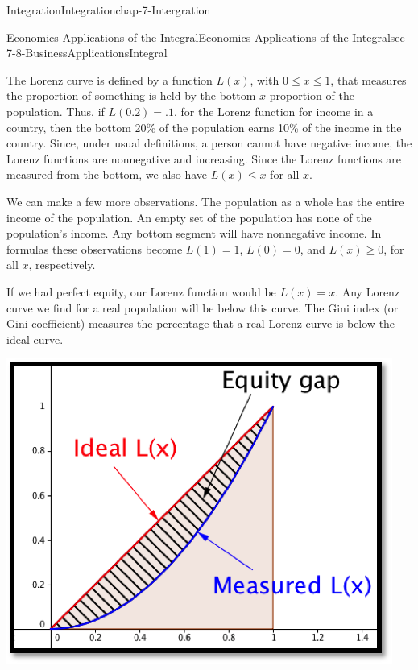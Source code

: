 \documentclass[oneside,10pt,]{book}
\numberwithin{equation}{section}
\begin{document}
\begin{chapterptx}{Integration}{}{Integration}{}{}{chap-7-Intergration}
\begin{sectionptx}{Economics Applications of the Integral}{}{Economics Applications of the Integral}{}{}{sec-7-8-BusinessApplicationsIntegral}
\par
\hypertarget{p-3111}{}%
The Lorenz curve is defined by a function \(L(x)\), with \(0\le x\le 1\), that measures the proportion of something is held by the bottom \(x\) proportion of the population.  Thus, if \(L(0.2)=.1\), for the Lorenz function for income in a country, then the bottom 20\% of the population earns 10\% of the income in the country.  Since, under usual definitions, a person cannot have negative income, the Lorenz functions are nonnegative and increasing.  Since the Lorenz functions are measured from the bottom, we also have \(L(x)\le x\) for all \(x\).%
\par
\hypertarget{p-3112}{}%
We can make a few more observations.  The population as a whole has the entire income of the population.  An empty set of the population has none of the population's income.  Any bottom segment will have nonnegative income.  In formulas these observations become \(L(1)=1\), \(L(0)=0\), and \(L(x)\ge 0\), for all \(x\), respectively.%
\par
\hypertarget{p-3113}{}%
If we had perfect equity, our Lorenz function would be \(L(x)=x\).  Any Lorenz curve we find for a real population will be below this curve.  The Gini index (or Gini coefficient) measures the percentage that a real Lorenz curve is below the ideal curve.%
\begin{sidebyside}{1}{0.25}{0.25}{0}%
\begin{sbspanel}{0.5}%
\includegraphics[width=1\linewidth]{images/sec7-8-15.png}
\end{sbspanel}%
\end{sidebyside}%

\end{sectionptx}
\end{chapterptx}
\end{document}
